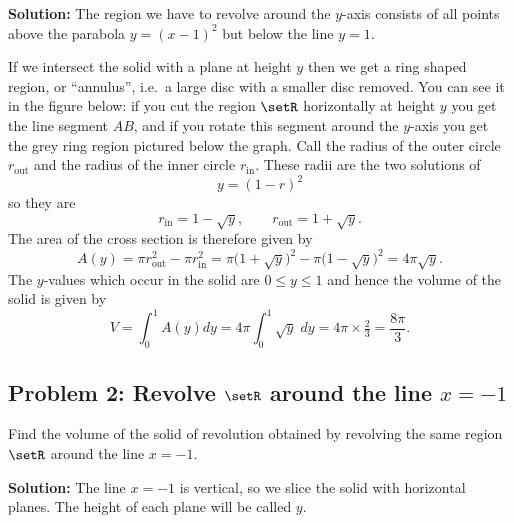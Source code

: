 \textbf{Solution: } The region we have to revolve around the $y$-axis consists
of all points above the parabola $y=(x-1)^2$ but below the line $y=1$.

If we intersect the solid with a plane at height $y$ then we get a ring shaped
region, or ``annulus'', i.e.\ a large disc with a smaller disc removed.  You can
see it in the figure below: if you cut the region $\setR$ horizontally at height
$y$ you get the line segment $AB$, and if you rotate this segment around the
$y$-axis you get the grey ring region pictured below the graph.  Call the radius
of the outer circle $r_{\textrm{out}}$ and the radius of the inner circle
$r_{\textrm{in}}$.  These radii are the two solutions of
\[
y = (1-r)^2
\]
so they are
\[
r_{\textrm{in}} = 1-\sqrt y, \qquad r_{\textrm{out}} = 1+\sqrt y.
\]
The area of the cross section is therefore given by
\[
A(y) = \pi r_{\textrm{out}}^2 - \pi r_{\textrm{in}}^2 =\pi\bigl(1+\surd
y\bigr)^2 - \pi\bigl(1-\surd y\bigr)^2 =4\pi\surd y.
\]
The $y$-values which occur in the solid are $0\leq y\leq 1$ and hence the volume
of the solid is given by
\[
V = \int_0^1 A(y) dy = 4\pi \int_0^1\sqrt y\; dy = 4\pi \times \tfrac23 =
\frac{8\pi}3.
\]

\subsection{Problem 2: Revolve $\setR$ around the line $x=-1$}
Find the volume of the solid of revolution obtained by revolving the same region
$\setR$ around the line $x=-1$.

\textbf{Solution: } The line $x=-1$ is vertical, so we slice the solid with
horizontal planes.  The height of each plane will be called $y$.

